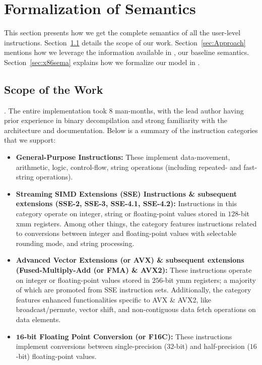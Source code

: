 \section{Formalization of \ISA Semantics}
\label{sec:harvestsema}
This section presents how we get the complete semantics of all the
user-level instructions. Section~\ref{sec:IC} details the scope of our work. Section~\ref{sec:Approach} mentions how we leverage the information available in \Strata, our baseline semantics. Section~\ref{sec:x86sema} explains how we formalize our model in \K.

\subsection{Scope of the Work}\label{sec:IC}
. The entire implementation took 8 man-months, with the lead author having prior experience in binary decompilation and strong familiarity with the \ISA architecture and documentation.
Below is a summary of the instruction categories that we support:
\begin{itemize}
    \item \textbf{General-Purpose Instructions:} These implement data-movement, arithmetic, logic, control-flow, string operations (including repeated- and fast- string operations).
    
    \item \textbf{Streaming SIMD Extensions (SSE) Instructions \&   subsequent extensions (SSE-2, SSE-3, SSE-4.1, SSE-4.2):} Instructions in this category operate on integer, string or floating-point values stored in $128$-bit xmm registers. Among other things, the category features instructions related to conversions between integer and floating-point values with selectable rounding mode, and string processing.
    
    \item \textbf{Advanced Vector Extensions (or AVX) \& subsequent extensions (Fused-Multiply-Add (or FMA) \& AVX2):} These instructions operate on integer or floating-point values stored in $256$-bit ymm registers; a majority of which are promoted from SSE instruction sets. Additionally, the category features enhanced functionalities specific to AVX \& AVX2, like  broadcast/permute, vector shift, and non-contiguous data fetch operations on data elements. 
    \item \textbf{$\textbf{16}$-bit Floating Point Conversion (or F16C):} These instructions implement conversions between single-precision ($32$-bit) and half-precision ($16$-bit) floating-point values. 
\end{itemize}

